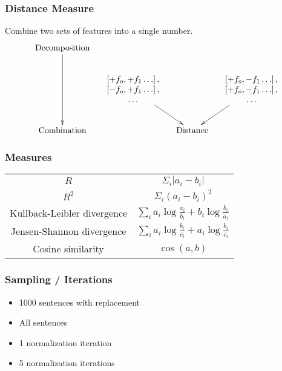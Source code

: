 \documentclass{beamer}
\begin{document}
\begin{frame}
  \frametitle{Distance Measure}
  Combine two sets of features into a single number.
\[\xymatrix@C=1pc{
\textrm{Decomposition}\ar@{>}[dd] &&&\\
 &
 *{\begin{array}{c}
     \left[ + f_o, +f_1 \ldots \right], \\
     \left[ - f_o, +f_1 \ldots \right], \\
     \ldots \\ \end{array}}
 \ar@{>}[dr]
 &&
 *{\begin{array}{c}
     \left[ + f_o, -f_1 \ldots \right], \\
     \left[ + f_o, -f_1 \ldots \right], \\
     \ldots \\ \end{array}}
 \ar@{>}[dl]  \\
 \textrm{Combination} && \textrm{Distance} & \\
} \]
\end{frame}
\begin{frame}
  \frametitle{Measures}
  \begin{tabular}{c|c}
  $R$ & $\Sigma_i |a_i - b_i|$ \\
  $R^2$ & $\Sigma_i (a_i - b_i)^2$ \\ \hline
  Kullback-Leibler divergence & $\sum_i {a_i \log\frac{a_i}{b_i} + b_i \log\frac{b_i}{a_i}}$ \\
  Jensen-Shannon divergence & $\sum_i {a_i \log\frac{b_i}{\bar{c_i}} + a_i \log\frac{b_i}{\bar{c_i}}}$ \\ \hline
  Cosine similarity & $\cos(a,b)$ \\
  \end{tabular}
\end{frame}
\begin{frame}
  \frametitle{Sampling / Iterations}
  \begin{itemize}
  \item 1000 sentences with replacement
  \item All sentences
 \end{itemize}
  \begin{itemize}
  \item 1 normalization iteration
  \item 5 normalization iterations
 \end{itemize}
\end{frame}
\end{document}
